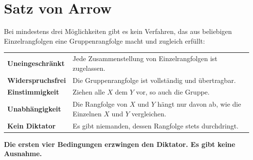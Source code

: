 \section{Satz von Arrow}

\begin{merksatz}
Bei mindestens drei Möglichkeiten gibt es kein Verfahren, das aus beliebigen Einzelrangfolgen eine Gruppenrangfolge macht und zugleich erfüllt:

\begin{center}
{\small
\renewcommand{\arraystretch}{1.55}
\begin{tabular}{@{}P{2.8cm}P{5.8cm}@{}}
\toprule
\textbf{Uneingeschränkt} & Jede Zusammenstellung von Einzelrangfolgen ist zugelassen.\\
\textbf{Widerspruchsfrei} & Die Gruppenrangfolge ist vollständig und übertragbar.\\
\textbf{Einstimmigkeit} & Ziehen alle $X$ dem $Y$ vor, so auch die Gruppe.\\
\textbf{Unabhängigkeit} & Die Rangfolge von $X$ und $Y$ hängt nur davon ab, wie die Einzelnen $X$ und $Y$ vergleichen.\\
\midrule
\textbf{Kein Diktator} & Es gibt niemanden, dessen Rangfolge stets durchdringt.\\
\bottomrule
\end{tabular}}
\end{center}

\begin{center}
\begin{minipage}{0.9\textwidth}
\textbf{Die ersten vier Bedingungen erzwingen den Diktator. Es gibt keine Ausnahme.}
\end{minipage}
\end{center}

\begin{center}
\begin{minipage}{0.88\textwidth}
\end{minipage}
\end{center}
\end{merksatz}

